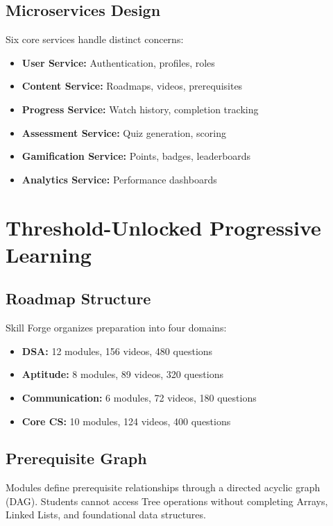 \documentclass[conference]{IEEEtran}
\begin{document}
\subsection{Microservices Design}

Six core services handle distinct concerns:
\begin{itemize}
    \item \textbf{User Service:} Authentication, profiles, roles
    \item \textbf{Content Service:} Roadmaps, videos, prerequisites
    \item \textbf{Progress Service:} Watch history, completion tracking
    \item \textbf{Assessment Service:} Quiz generation, scoring
    \item \textbf{Gamification Service:} Points, badges, leaderboards
    \item \textbf{Analytics Service:} Performance dashboards
\end{itemize}

\section{Threshold-Unlocked Progressive Learning}

\subsection{Roadmap Structure}

Skill Forge organizes preparation into four domains:
\begin{itemize}
    \item \textbf{DSA:} 12 modules, 156 videos, 480 questions
    \item \textbf{Aptitude:} 8 modules, 89 videos, 320 questions
    \item \textbf{Communication:} 6 modules, 72 videos, 180 questions
    \item \textbf{Core CS:} 10 modules, 124 videos, 400 questions
\end{itemize}

\subsection{Prerequisite Graph}

Modules define prerequisite relationships through a directed acyclic graph (DAG). Students cannot access Tree operations without completing Arrays, Linked Lists, and foundational data structures.
\end{document}
